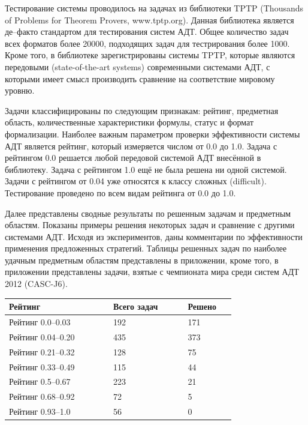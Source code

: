 \documentclass[a4paper]{report}
\begin{document}
Тестирование системы проводилось на задачах из библиотеки TPTP (Thousands of Problems for Theorem Provers, www.tptp.org). Данная библиотека является де--факто стандартом для тестирования систем АДТ. Общее количество задач всех форматов более 20000, подходящих задач для тестрирования более 1000. Кроме того,  в библиотеке зарегистрированы системы TPTP, которые являются передовыми (state-of-the-art systems) современными системами АДТ, с которыми имеет смысл производить сравнение на соответствие мировому уровню.

Задачи классифицированы по следующим признакам: рейтинг, предметная область, количественные характеристики формулы, статус и формат формализации. Наиболее важным параметром проверки эффективности системы АДТ является рейтинг, который измеряется числом от 0.0 до 1.0. Задача с рейтингом 0.0 решается любой передовой системой АДТ внесённой в библиотеку. Задача с рейтингом 1.0 ещё не была решена ни одной системой. Задачи с рейтингом от 0.04 уже относятся к классу сложных (difficult). Тестирование проведено по всем видам рейтинга от 0.0 до 1.0.

Далее представлены сводные результаты по решенным задачам и предметным областям. Показаны примеры решения некоторых задач и сравнение с другими системами АДТ. Исходя из экспериментов, даны комментарии по эффективности применения предложенных стратегий. Таблицы решенных задач по наиболее удачным предметным областям представлены в приложении, кроме того, в приложении представлены задачи, взятые с чемпионата мира среди систем АДТ 2012 (CASC-J6).



{\small{}
\begin{longtable}[H]{|p{0.35\linewidth}|p{0.25\linewidth}|p{0.15\linewidth}|}
\hline
\textbf{Рейтинг} & \textbf{Всего задач} & \textbf{Решено} \\
\hline
Рейтинг 0.0--0.03 & 192 & 171 \\
\hline
Рейтинг 0.04--0.20 & 435 & 373 \\
\hline
Рейтинг 0.21--0.32 & 128 & 75 \\
\hline
Рейтинг 0.33--0.49 & 115 & 44 \\
\hline
Рейтинг 0.5--0.67 & 223 & 21 \\
\hline
Рейтинг 0.68--0.92 & 72 & 5 \\
\hline
Рейтинг 0.93--1.0 & 56 & 0\\
\hline
\end{longtable}
}
\end{document}
